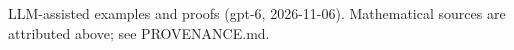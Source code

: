 \documentclass[11pt]{article}
\begin{document}

\bigskip
{\footnotesize LLM-assisted examples and proofs (gpt-6, 2026-11-06).
Mathematical sources are attributed above; see PROVENANCE.md.}
\end{document}
